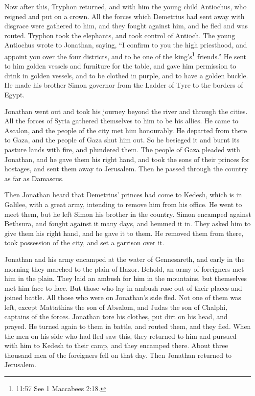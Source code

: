  Now after this, Tryphon returned, and with him the young
child Antiochus, who reigned and put on a crown.  All the
forces which Demetrius had sent away with disgrace were gathered to him,
and they fought against him, and he fled and was routed. 
Tryphon took the elephants, and took control of Antioch. 
The young Antiochus wrote to Jonathan, saying, ``I confirm to you the
high priesthood, and appoint you over the four districts, and to be one
of the king's\footnote{11:57 See 1 Maccabees 2:18.} friends.''
 He sent to him golden vessels and furniture for the table,
and gave him permission to drink in golden vessels, and to be clothed in
purple, and to have a golden buckle.  He made his brother
Simon governor from the Ladder of Tyre to the borders of Egypt.

 Jonathan went out and took his journey beyond the river
and through the cities. All the forces of Syria gathered themselves to
him to be his allies. He came to Ascalon, and the people of the city met
him honourably.  He departed from there to Gaza, and the
people of Gaza shut him out. So he besieged it and burnt its pasture
lands with fire, and plundered them.  The people of Gaza
pleaded with Jonathan, and he gave them his right hand, and took the
sons of their princes for hostages, and sent them away to Jerusalem.
Then he passed through the country as far as Damascus.

 Then Jonathan heard that Demetrius' princes had come to
Kedesh, which is in Galilee, with a great army, intending to remove him
from his office.  He went to meet them, but he left Simon
his brother in the country.  Simon encamped against
Bethsura, and fought against it many days, and hemmed it in.
 They asked him to give them his right hand, and he gave it
to them. He removed them from there, took possession of the city, and
set a garrison over it.

 Jonathan and his army encamped at the water of
Gennesareth, and early in the morning they marched to the plain of
Hazor.  Behold, an army of foreigners met him in the plain.
They laid an ambush for him in the mountains, but themselves met him
face to face.  But those who lay in ambush rose out of
their places and joined battle. All those who were on Jonathan's side
fled.  Not one of them was left, except Mattathias the son
of Absalom, and Judas the son of Chalphi, captains of the forces.
 Jonathan tore his clothes, put dirt on his head, and
prayed.  He turned again to them in battle, and routed
them, and they fled.  When the men on his side who had fled
saw this, they returned to him and pursued with him to Kedesh to their
camp, and they encamped there.  About three thousand men of
the foreigners fell on that day. Then Jonathan returned to Jerusalem.

